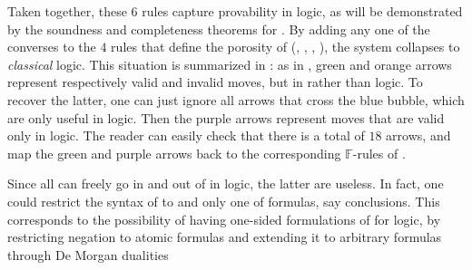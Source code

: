 \begin{description}
  Taken together, these $6$ rules capture provability in
  \emph{} logic, as will be demonstrated by the soundness and
  completeness theorems for . By adding any one of the converses
  to the $4$ rules that define the porosity of   (, , ,
  ), the system collapses to \emph{classical} logic.
  This situation is summarized in : as in
  , green and orange arrows represent respectively valid
  and invalid moves, but in  rather than  logic.
  To recover the latter, one can just ignore all arrows that cross the blue
  bubble, which are only useful in  logic. Then the purple
  arrows represent moves that are valid only in  logic. The reader can
  easily check that there is a total of $18$ arrows, and map the green and
  purple arrows back to the corresponding $\mathbb{F}$-rules of
  .

  \begin{remark}
    Since all  can freely go in and out of   in 
    logic, the latter are useless. In fact, one could restrict the syntax of
     to   and only one  of formulas, say
    conclusions. This corresponds to the possibility of having one-sided
    formulations of  for  logic, by restricting negation
    to atomic formulas and extending it to arbitrary formulas through De Morgan
    dualities
  \end{remark}
  

\end{description}
